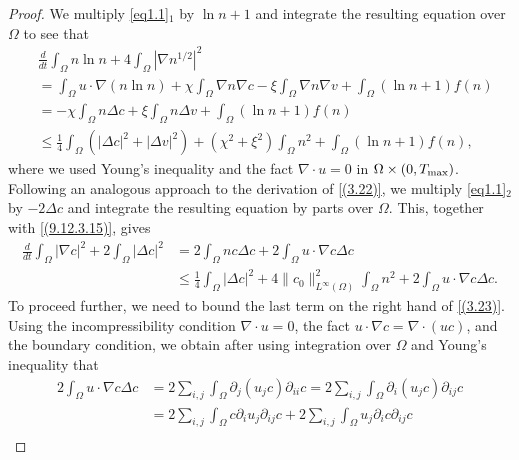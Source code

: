 \documentclass[reqno]{amsart}
\begin{document}
\begin{proof} 
We multiply \eqref{eq1.1}$_1$  by $ \ln n + 1 $ and integrate the resulting equation 
over $ \Omega $ to see that
\begin{equation}\label{(3.22)}
\begin{aligned}
&\frac{d}{dt} \int_{\Omega} n \ln n  + 4 \int_{\Omega} |\nabla n^{1/2}|^2
\\&= \int_{\Omega} u \cdot \nabla (n\ln n) 
 + \chi \int_{\Omega} \nabla n \nabla c-\xi \int_{\Omega} \nabla n \nabla v 
 + \int_{\Omega} (\ln n + 1)
f(n) \\
&= -\chi \int_{\Omega} n \Delta c +\xi \int_{\Omega} n \Delta v
  + \int_{\Omega} (\ln n + 1) f(n) \\
&\leq \frac{1}{4} \int_{\Omega} \left(|\Delta c|^2+|\Delta v|^2\right)
  + (\chi^2+\xi^2 ) \int_{\Omega} n^2 + \int_{\Omega} \left(\ln n + 1\right) f(n),
\end{aligned}
\end{equation}
where we used Young's inequality and the fact $\nabla \cdot u = 0$ in 
$\Omega \times (0, T_{\rm max})$. Following an analogous approach to the derivation 
of \eqref{(3.22)}, we multiply \eqref{eq1.1}$_2$ by $-2\Delta c$ and integrate the 
resulting equation by parts over $\Omega$. This, together with \eqref{(9.12.3.15)}, 
gives 
\begin{equation}\label{(3.23)}
\begin{aligned}
\frac{d}{dt} \int_\Omega |\nabla c|^2 + 2 \int_\Omega |\Delta c|^2
&= 2 \int_\Omega nc\Delta c + 2 \int_\Omega u \cdot \nabla c \Delta c \\
&\leq \frac{1}{4} \int_\Omega |\Delta c|^2 
 + 4\|c_0\|_{L^\infty(\Omega)}^2 \int_\Omega n^2 
 + 2 \int_\Omega u \cdot \nabla c \Delta c.
\end{aligned}
\end{equation}
To proceed further, we need to bound the last term on the right hand of \eqref{(3.23)}. 
Using the incompressibility condition $\nabla \cdot u=0$, the fact 
$u \cdot \nabla c =\nabla \cdot (uc)$, and the boundary condition, we obtain after
 using integration over $\Omega$ and Young's inequality that
\begin{equation}\label{(3.24)}
\begin{aligned}
2 \int_\Omega u \cdot \nabla c \Delta c
&= 2 \sum_{i,j} \int_\Omega \partial_j (u_j c)\partial_{ii} c
 = 2 \sum_{i,j} \int_\Omega \partial_i (u_j c)\partial_{ij} c \\
&= 2 \sum_{i,j} \int_\Omega c\partial_i u_j  \partial_{ij} c 
 + 2 \sum_{i,j} \int_\Omega u_j \partial_i c \partial_{ij} c  \\

\end{aligned}
\end{equation}
\end{proof}
\end{document}
